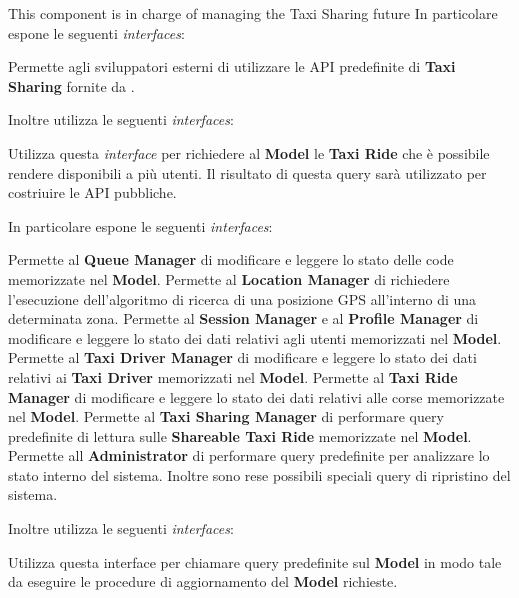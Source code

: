 \begin{itemize}
\begin{itemize}
		This component is in charge of managing the Taxi Sharing future 
		In particolare espone le seguenti \textit{interfaces}:
		\begin{itemize}
			 Permette agli sviluppatori esterni di utilizzare le API predefinite  di \textbf{Taxi Sharing} fornite da \myTaxiService{}.
		\end{itemize}
		Inoltre utilizza le seguenti \textit{interfaces}:
		\begin{itemize}
			 Utilizza questa \textit{interface} per richiedere al \textbf{Model} le \textbf{Taxi Ride} che è possibile rendere disponibili a più utenti. 
			Il risultato di questa query sarà utilizzato per costriuire le API pubbliche.
		\end{itemize}
		
		\itemBold{Query Manager}
		In particolare espone le seguenti \textit{interfaces}:
		\begin{itemize}
			 Permette al \textbf{Queue Manager} di modificare e leggere lo stato delle code memorizzate nel \textbf{Model}.
			 Permette al \textbf{Location Manager} di richiedere l'esecuzione dell'algoritmo di ricerca di una posizione GPS all'interno di una  determinata zona.
			 Permette al \textbf{Session Manager} e al \textbf{Profile Manager} di modificare e leggere lo stato dei dati relativi agli utenti memorizzati nel \textbf{Model}.
			 Permette al \textbf{Taxi Driver Manager} di modificare e leggere lo stato dei dati relativi ai \textbf{Taxi Driver} memorizzati nel \textbf{Model}.
			 Permette al \textbf{Taxi Ride Manager} di modificare e leggere lo stato dei dati relativi alle corse memorizzate nel \textbf{Model}.
			 Permette al \textbf{Taxi Sharing Manager} di performare query predefinite di lettura sulle \textbf{Shareable Taxi Ride} memorizzate nel \textbf{Model}.
			 Permette all \textbf{Administrator} di performare query predefinite per analizzare lo stato interno del sistema.
			Inoltre sono rese possibili speciali query di ripristino del sistema.
		\end{itemize}
		Inoltre utilizza le seguenti \textit{interfaces}:
		\begin{itemize}
			 Utilizza questa interface per chiamare query predefinite sul \textbf{Model} in modo tale da eseguire le procedure di aggiornamento del \textbf{Model} richieste.
		\end{itemize}
	\end{itemize}
	

\end{itemize}
